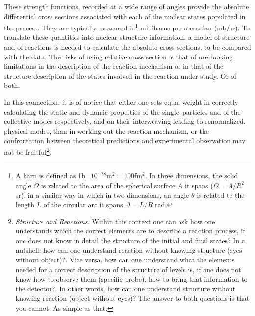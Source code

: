 These strength functions, recorded at a wide range of angles provide the absolute differential cross sections associated with each of the nuclear states populated in the process. They are  typically measured in\footnote{A barn is defined as 1b=$10^{-28}$m$^2=100$fm$^2$. In three dimensions, the solid angle $\Omega$ is related to the area of the spherical surface $A$ it spans ($\Omega=A/R^2$ sr), in a similar way in which in two dimensions, an angle $\theta$ is related to the length $L$ of the circular arc it spans. $\theta=L/R$ rad.} millibarns per  steradian (mb/sr). To translate these quantities into nuclear structure information, a model of structure and of reactions is needed to calculate the absolute cross sections, to be compared with the data. The risks of using relative cross section is that of overlooking limitations in the description of the reaction mechanism or in that of the structure description of the states involved in the reaction under study. Or of both.

In this connection, it is of notice that either one sets equal weight in correctly calculating the static and dynamic   properties  of the single--particles and of the collective modes respectively, and on their interweaving leading to renormalized, physical modes, than in working out the reaction mechanism, or the confrontation between theoretical predictions and experimental observation may not be fruitful\footnote{\textit{Structure and Reactions}. Within this context one can ask how one understands which the correct elements are to describe a reaction process, if one does not know in detail the structure of the initial and final states? In a nutshell: how can one understand reaction without knowing structure (eyes without object)?. 
Vice versa, how can one understand what the elements needed for a correct description of the structure of levels is, if one does not know how to observe them (specific probe), how to bring that information to the detector?. In other words, how can one understand structure without knowing reaction (object without eyes)? The answer to both questions is that you cannot. As simple as that.}.

